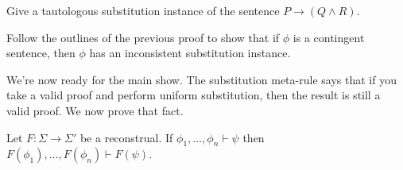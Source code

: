 \begin{exercise} Give a tautologous substitution instance
  of the sentence $P\to (Q\wedge R)$. \end{exercise}

\begin{exercise} Follow the outlines of the previous proof to show
  that if $\phi$ is a contingent sentence, then $\phi$ has an
  inconsistent substitution instance. \end{exercise}

We're now ready for the main show.  The substitution meta-rule says
that if you take a valid proof and perform uniform substitution, then
the result is still a valid proof.  We now prove that fact.

\begin{subthm} Let $F:\Sigma\to\Sigma '$ be a reconstrual.  If
  $\phi _1,\dots ,\phi _n\vdash \psi$ then
  $F(\phi _1),\dots ,F(\phi _n)\vdash F(\psi )$. \end{subthm} 

